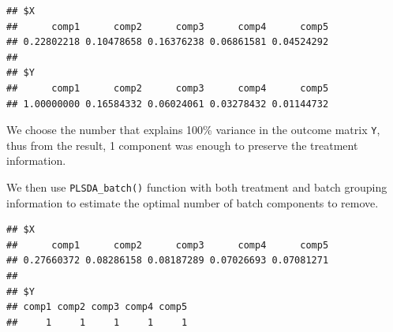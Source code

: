 \documentclass[
]{book}
\newenvironment{Shaded}{\begin{snugshade}}{\end{snugshade}}
\newcommand{\AttributeTok}[1]{\textcolor[rgb]{0.77,0.63,0.00}{#1}}
\newcommand{\CommentTok}[1]{\textcolor[rgb]{0.56,0.35,0.01}{\textit{#1}}}
\newcommand{\DecValTok}[1]{\textcolor[rgb]{0.00,0.00,0.81}{#1}}
\newcommand{\FunctionTok}[1]{\textcolor[rgb]{0.00,0.00,0.00}{#1}}
\newcommand{\NormalTok}[1]{#1}
\newcommand{\OtherTok}[1]{\textcolor[rgb]{0.56,0.35,0.01}{#1}}
\newcommand{\SpecialCharTok}[1]{\textcolor[rgb]{0.00,0.00,0.00}{#1}}
\begin{document}
\begin{Shaded}
\end{Shaded}

\begin{verbatim}
## $X
##      comp1      comp2      comp3      comp4      comp5 
## 0.22802218 0.10478658 0.16376238 0.06861581 0.04524292 
## 
## $Y
##      comp1      comp2      comp3      comp4      comp5 
## 1.00000000 0.16584332 0.06024061 0.03278432 0.01144732
\end{verbatim}

We choose the number that explains 100\% variance in the outcome matrix \texttt{Y}, thus from the result, 1 component was enough to preserve the treatment information.

We then use \texttt{PLSDA\_batch()} function with both treatment and batch grouping information to estimate the optimal number of batch components to remove.

\begin{Shaded}
\end{Shaded}

\begin{verbatim}
## $X
##      comp1      comp2      comp3      comp4      comp5 
## 0.27660372 0.08286158 0.08187289 0.07026693 0.07081271 
## 
## $Y
## comp1 comp2 comp3 comp4 comp5 
##     1     1     1     1     1
\end{verbatim}
\end{document}
